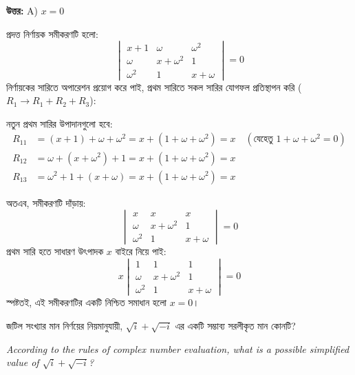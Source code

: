 \documentclass[12pt, a4paper]{article}
\begin{document}
\vspace{0.5em}
\begin{tcolorbox}[answerbox]
    \textbf{\color{success} উত্তর:} A) $x = 0$
\end{tcolorbox}
\vspace{1em}

\begin{tcolorbox}[solutionbox={সমাধান (Solution)}]
    \noindent
    প্রদত্ত নির্ণায়ক সমীকরণটি হলো:
    \[ \begin{vmatrix} x+1 & \omega & \omega^2 \\ \omega & x+\omega^2 & 1 \\ \omega^2 & 1 & x+\omega \end{vmatrix} = 0 \]
    নির্ণায়কের সারিতে অপারেশন প্রয়োগ করে পাই, প্রথম সারিতে সকল সারির যোগফল প্রতিস্থাপন করি ($R_1 \rightarrow R_1 + R_2 + R_3$):
    
    \vspace{0.5em}
    নতুন প্রথম সারির উপাদানগুলো হবে:
    \begin{align*}
        R_{11} &= (x + 1) + \omega + \omega^2 = x + (1 + \omega + \omega^2) = x \quad (\text{যেহেতু } 1 + \omega + \omega^2 = 0) \\
        R_{12} &= \omega + (x + \omega^2) + 1 = x + (1 + \omega + \omega^2) = x \\
        R_{13} &= \omega^2 + 1 + (x + \omega) = x + (1 + \omega + \omega^2) = x
    \end{align*}
    
    \vspace{0.5em}
    অতএব, সমীকরণটি দাঁড়ায়:
    \[ \begin{vmatrix} x & x & x \\ \omega & x+\omega^2 & 1 \\ \omega^2 & 1 & x+\omega \end{vmatrix} = 0 \]
    প্রথম সারি হতে সাধারণ উৎপাদক $x$ বাইরে নিয়ে পাই:
    \[ x \begin{vmatrix} 1 & 1 & 1 \\ \omega & x+\omega^2 & 1 \\ \omega^2 & 1 & x+\omega \end{vmatrix} = 0 \]
    স্পষ্টতই, এই সমীকরণটির একটি নিশ্চিত সমাধান হলো $x = 0$।
\end{tcolorbox}
\begin{tcolorbox}[questionbox={প্রশ্ন (Question) 10}]
    \noindent
    জটিল সংখ্যার মান নির্ণয়ের নিয়মানুযায়ী, $\sqrt{i} + \sqrt{-i}$ এর একটি সম্ভাব্য সরলীকৃত মান কোনটি?
    
    \vspace{0.8em}
    \begin{english}
    \noindent\textit{\color{darkgray}
    According to the rules of complex number evaluation, what is a possible simplified value of $\sqrt{i} + \sqrt{-i}$?
    }
    \end{english}
\end{tcolorbox}
\end{document}
